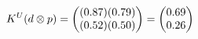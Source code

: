 \documentclass[preview]{standalone}
\begin{document}
\begin{align*}
\special{dvisvgm:raw <g id='unique000'>}K^U(d \otimes p) = \begin{pmatrix} (0.87)(0.79) \\ (0.52)(0.50) \end{pmatrix} = \begin{pmatrix} 0.69 \\ 0.26 \end{pmatrix}\special{dvisvgm:raw </g>}
\end{align*}
\end{document}

